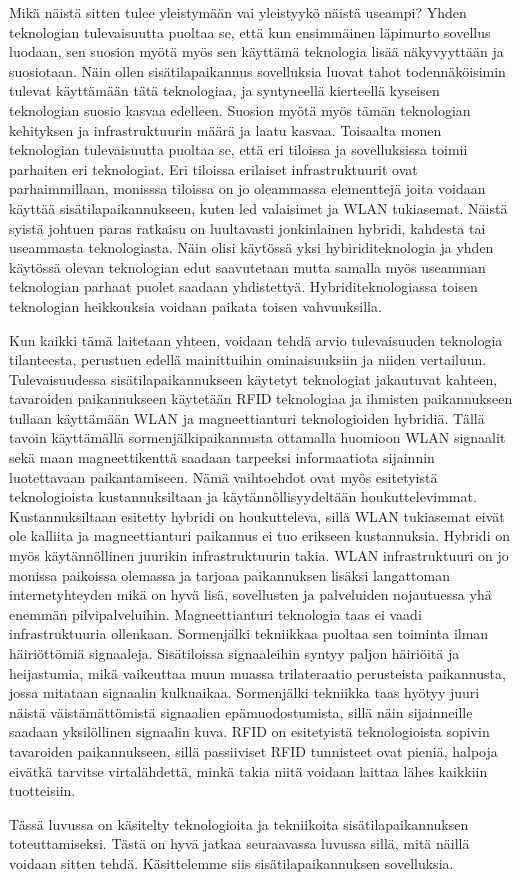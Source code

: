 Mikä näistä sitten tulee yleistymään vai yleistyykö näistä useampi? Yhden teknologian tulevaisuutta puoltaa se, että kun ensimmäinen läpimurto sovellus luodaan, sen suosion myötä myös sen käyttämä teknologia lisää näkyvyyttään ja suosiotaan. Näin ollen sisätilapaikannus sovelluksia luovat tahot todennäköisimin tulevat käyttämään tätä teknologiaa, ja syntyneellä kierteellä kyseisen teknologian suosio kasvaa edelleen. Suosion myötä myös tämän teknologian kehityksen ja infrastruktuurin määrä ja laatu kasvaa. Toisaalta monen teknologian tulevaisuutta puoltaa se, että eri tiloissa ja sovelluksissa toimii parhaiten eri teknologiat. Eri tiloissa erilaiset infrastruktuurit ovat parhaimmillaan, monisssa tiloissa on jo oleammassa elementtejä joita voidaan käyttää sisätilapaikannukseen, kuten led valaisimet ja WLAN tukiasemat. Näistä syistä johtuen paras ratkaisu on luultavasti jonkinlainen hybridi, kahdesta tai useammasta teknologiasta. Näin olisi käytössä yksi hybiriditeknologia ja yhden käytössä olevan teknologian edut saavutetaan mutta samalla myös useamman teknologian parhaat puolet saadaan yhdistettyä. Hybriditeknologiassa toisen teknologian heikkouksia voidaan paikata toisen vahvuuksilla.

Kun kaikki tämä laitetaan yhteen, voidaan tehdä arvio tulevaisuuden teknologia tilanteesta, perustuen edellä mainittuihin ominaisuuksiin ja niiden vertailuun. Tulevaisuudessa sisätilapaikannukseen käytetyt teknologiat jakautuvat kahteen, tavaroiden paikannukseen käytetään RFID teknologiaa ja ihmisten paikannukseen tullaan käyttämään WLAN ja magneettianturi teknologioiden hybridiä. Tällä tavoin käyttämällä sormenjälkipaikannusta ottamalla huomioon WLAN signaalit sekä maan magneettikenttä saadaan tarpeeksi informaatiota sijainnin luotettavaan paikantamiseen. Nämä vaihtoehdot ovat myös esitetyistä teknologioista kustannuksiltaan ja käytännöllisyydeltään houkuttelevimmat. Kustannuksiltaan esitetty hybridi on houkutteleva, sillä WLAN tukiasemat eivät ole kalliita ja magneettianturi paikannus ei tuo erikseen kustannuksia. Hybridi on myös käytännöllinen juurikin infrastruktuurin takia. WLAN infrastruktuuri on jo monissa paikoissa olemassa ja tarjoaa paikannuksen lisäksi langattoman internetyhteyden mikä on hyvä lisä, sovellusten ja palveluiden nojautuessa yhä enemmän pilvipalveluihin. Magneettianturi teknologia taas ei vaadi infrastruktuuria ollenkaan. Sormenjälki tekniikkaa puoltaa sen toiminta ilman häiriöttömiä signaaleja. Sisätiloissa signaaleihin syntyy paljon häiriöitä ja heijastumia, mikä vaikeuttaa muun muassa trilateraatio perusteista paikannusta, jossa mitataan signaalin kulkuaikaa. Sormenjälki tekniikka taas hyötyy juuri näistä väistämättömistä signaalien epämuodostumista, sillä näin sijainneille saadaan yksilöllinen signaalin kuva. RFID on esitetyistä teknologioista sopivin tavaroiden paikannukseen, sillä passiiviset RFID tunnisteet ovat pieniä, halpoja eivätkä tarvitse virtalähdettä, minkä takia niitä voidaan laittaa lähes kaikkiin tuotteisiin.

Tässä luvussa on käsitelty teknologioita ja tekniikoita sisätilapaikannuksen toteuttamiseksi. Tästä on hyvä jatkaa seuraavassa luvussa sillä, mitä näillä voidaan sitten tehdä. Käsittelemme siis sisätilapaikannuksen sovelluksia.



